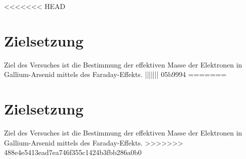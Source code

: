 <<<<<<< HEAD
\section{Zielsetzung}
\label{sec:zielsetzung}

Ziel des Versuches ist die Bestimmung der effektiven Masse der Elektronen in Gallium-Arsenid mittels des Faraday-Effekts.
||||||| 05b9994
=======
\section{Zielsetzung}
\label{sec:Zielsetzung}

Ziel des Versuches ist die Bestimmung der effektiven Masse der Elektronen in Gallium-Arsenid mittels des Faraday-Effekts.
>>>>>>> 488e4e5413ead7ea746f355c1424b3fbb286a0b0
